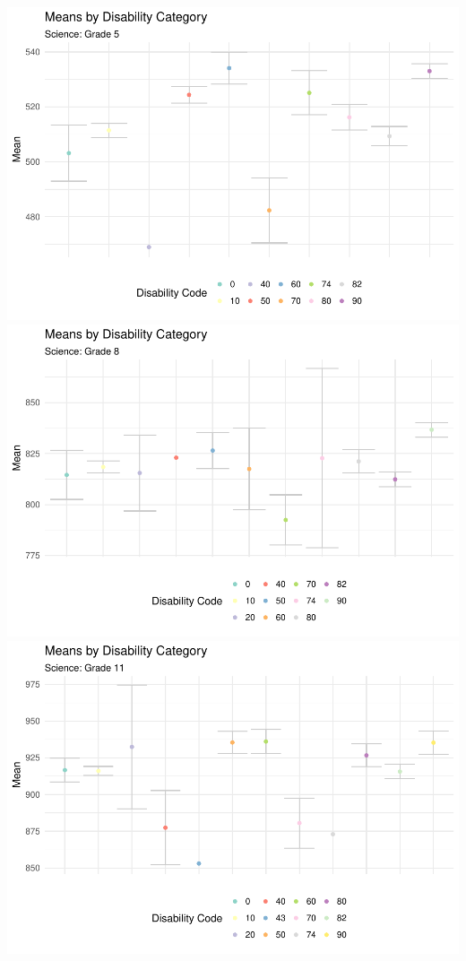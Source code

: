 \documentclass[]{article}
\begin{document}
\FloatBarrier
\includegraphics{tech_report_18_files/figure-latex/sci_plots5811-1.pdf}
\includegraphics{tech_report_18_files/figure-latex/sci_plots5811-2.pdf}
\includegraphics{tech_report_18_files/figure-latex/sci_plots5811-3.pdf}
\end{document}
